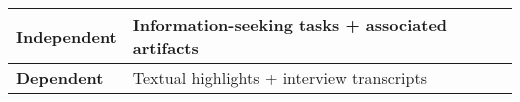 \begin{table}[!h]
\centering    
\begin{threeparttable}
\begin{tabular}{l|l}



\hline

\textbf{Independent } & Information-seeking tasks + associated artifacts \\
\hline
\textbf{Dependent} & Textual highlights + interview transcripts \\
\hline

\end{tabular}
\end{threeparttable}
\caption{}
\label{tbl:cp3-experiment-overview}
\end{table}

